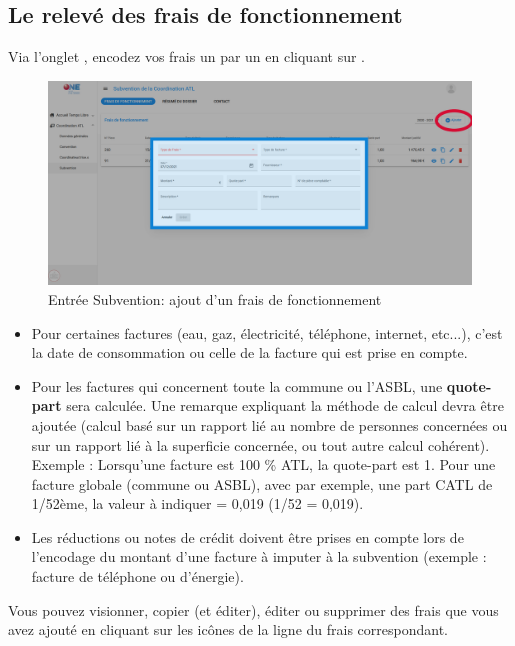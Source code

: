  
\subsection{Le relevé des frais de fonctionnement}
Via l’onglet , encodez vos frais un par un en cliquant sur .

\begin{figure}[htbp]
    \centering
    \includegraphics[width=13cm, frame]{Images/catl/frais_fonctionnement.png}
    \caption{Entrée Subvention: ajout d'un frais de fonctionnement}
    \label{fig:catl_frais_fonctionnement}
\end{figure}

\begin{itemize}
    \item Pour certaines factures (eau, gaz, électricité, téléphone, internet, etc...), c'est la date de consommation ou celle de la facture qui est prise en compte.
    \item Pour les factures qui concernent toute la commune ou  l’ASBL, une \textbf{quote-part} sera calculée. Une remarque expliquant la méthode de calcul devra être ajoutée (calcul basé sur un rapport lié au nombre de personnes concernées ou sur un rapport lié à la superficie concernée, ou tout autre calcul cohérent).
        \subitem Exemple : Lorsqu’une facture est 100 \% ATL, la quote-part est 1. Pour une facture globale (commune ou ASBL), avec par exemple, une part CATL de 1/52ème,  la valeur à indiquer = 0,019 (1/52 = 0,019). 
    \item Les réductions ou notes de crédit doivent être prises en compte lors de l’encodage du montant d’une facture à imputer à la subvention (exemple : facture de téléphone ou d’énergie).
\end{itemize}


\begin{info}
Vous pouvez visionner, copier (et éditer), éditer ou supprimer des frais que vous avez ajouté en cliquant sur les icônes de la ligne du frais correspondant.
\end{info}



